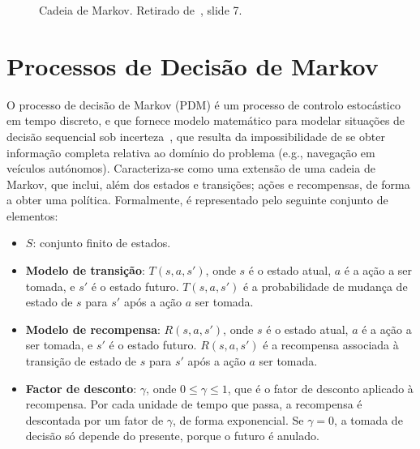 \begin{figure}[H]
    \begin{center}
    \end{center}
    \caption{Cadeia de Markov.
    Retirado de~\cite{isel:iasa:slides:processos-decisao-sequencial}, slide 7.}
    \label{fig:cadeia-de-markov}
\end{figure}

\section{Processos de Decisão de Markov}\label{sec:processos-de-decisao-de-markov}

O processo de decisão de Markov (PDM) é um processo de controlo estocástico em tempo discreto, e que fornece modelo matemático para modelar situações de decisão sequencial sob incerteza~\cite{wiki:mdp}, que resulta da impossibilidade de se obter informação completa relativa ao domínio do problema (e.g., navegação em veículos autónomos).
Caracteriza-se como uma extensão de uma cadeia de Markov, que inclui, além dos estados e transições; ações e recompensas,
de forma a obter uma política.
Formalmente, é representado pelo seguinte conjunto de elementos:

\begin{itemize}
    \item $S$: conjunto finito de estados.
    \item \textbf{Modelo de transição}: \( T(s, a, s') \), onde \( s \) é o estado atual, \( a \) é a ação a ser tomada, e \( s' \) é o estado futuro. \( T(s, a, s') \) é a probabilidade de mudança de estado de \( s \) para \( s' \) após a ação \( a \) ser tomada.
    \item \textbf{Modelo de recompensa}: \( R(s, a, s') \), onde \( s \) é o estado atual, \( a \) é a ação a ser tomada, e \( s' \) é o estado futuro. \( R(s, a, s') \) é a recompensa associada à transição de estado de \( s \) para \( s' \) após a ação \( a \) ser tomada.
    \item \textbf{Factor de desconto}: \( \gamma \), onde \( 0 \leq \gamma \leq 1 \), que é o fator de desconto aplicado à recompensa. Por cada unidade de tempo que passa, a recompensa é descontada por um fator de \( \gamma \), de forma exponencial. Se \( \gamma = 0 \), a tomada de decisão só depende do presente, porque o futuro é anulado.
\end{itemize}

